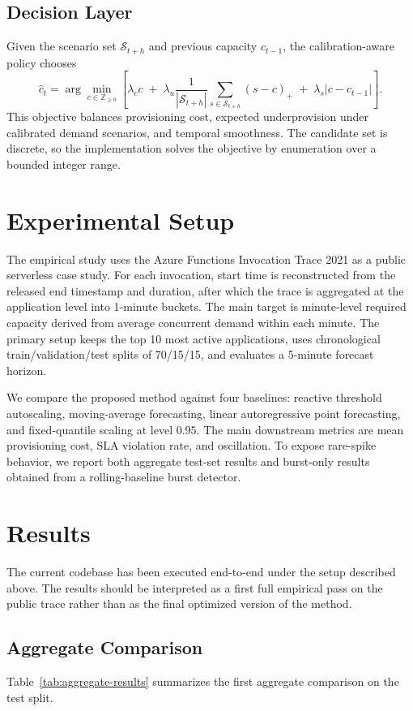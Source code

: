 \documentclass[11pt]{article}
\theoremstyle{plain}
\theoremstyle{definition}
\theoremstyle{remark}
\begin{document}
\subsection{Decision Layer}
Given the scenario set $\mathcal{S}_{t+h}$ and previous capacity $c_{t-1}$, the calibration-aware policy chooses
\[
\hat c_t
=
\arg\min_{c \in \mathbb{Z}_{\ge 0}}
\left[
\lambda_c c
\;+\;
\lambda_u \frac{1}{|\mathcal{S}_{t+h}|} \sum_{s \in \mathcal{S}_{t+h}} (s-c)_+
\;+\;
\lambda_s |c-c_{t-1}|
\right].
\]
This objective balances provisioning cost, expected underprovision under calibrated demand scenarios, and temporal smoothness. The candidate set is discrete, so the implementation solves the objective by enumeration over a bounded integer range.

\section{Experimental Setup}
The empirical study uses the Azure Functions Invocation Trace 2021 as a public serverless case study. For each invocation, start time is reconstructed from the released end timestamp and duration, after which the trace is aggregated at the application level into 1-minute buckets. The main target is minute-level required capacity derived from average concurrent demand within each minute. The primary setup keeps the top 10 most active applications, uses chronological train/validation/test splits of 70/15/15, and evaluates a 5-minute forecast horizon.

We compare the proposed method against four baselines: reactive threshold autoscaling, moving-average forecasting, linear autoregressive point forecasting, and fixed-quantile scaling at level $0.95$. The main downstream metrics are mean provisioning cost, SLA violation rate, and oscillation. To expose rare-spike behavior, we report both aggregate test-set results and burst-only results obtained from a rolling-baseline burst detector.

\section{Results}
The current codebase has been executed end-to-end under the setup described above. The results should be interpreted as a first full empirical pass on the public trace rather than as the final optimized version of the method.

\subsection{Aggregate Comparison}
Table~\ref{tab:aggregate-results} summarizes the first aggregate comparison on the test split.
\end{document}
